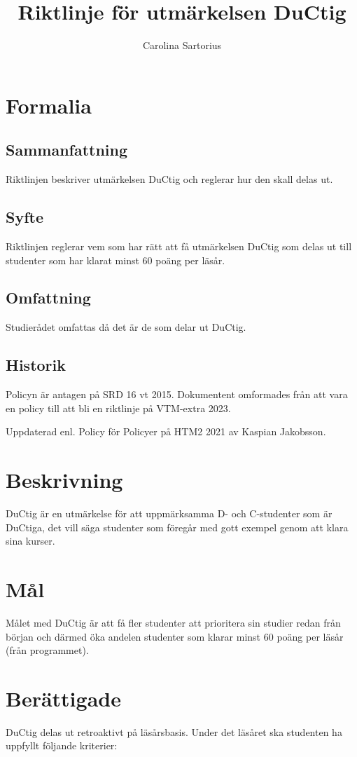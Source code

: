 \documentclass{dsekprotokoll}
\title{Riktlinje för utmärkelsen DuCtig}
\author{Carolina Sartorius}
\begin{document}
\maketitle

\section{Formalia}
\subsection{Sammanfattning}
Riktlinjen beskriver utmärkelsen DuCtig och reglerar hur den skall delas ut.
\subsection{Syfte}
Riktlinjen reglerar vem som har rätt att få utmärkelsen DuCtig som delas ut till studenter som har klarat minst 60 poäng per läsår.
\subsection{Omfattning}
Studierådet omfattas då det är de som delar ut DuCtig.
\subsection{Historik}
Policyn är antagen på SRD 16 vt 2015. Dokumentent omformades från att vara en policy till att bli en riktlinje på VTM-extra 2023.

Uppdaterad enl. Policy för Policyer på HTM2 2021 av Kaspian Jakobsson.

\section{Beskrivning}
DuCtig är en utmärkelse för att uppmärksamma D- och C-studenter som är DuCtiga, det vill
säga studenter som föregår med gott exempel genom att klara sina kurser.

\section{Mål}
Målet med DuCtig är att få fler studenter att prioritera sin studier redan från början och därmed
öka andelen studenter som klarar minst 60 poäng per läsår (från programmet).

\section{Berättigade}
DuCtig delas ut retroaktivt på läsårsbasis. Under det läsåret ska studenten ha uppfyllt följande
kriterier:
\end{document}
